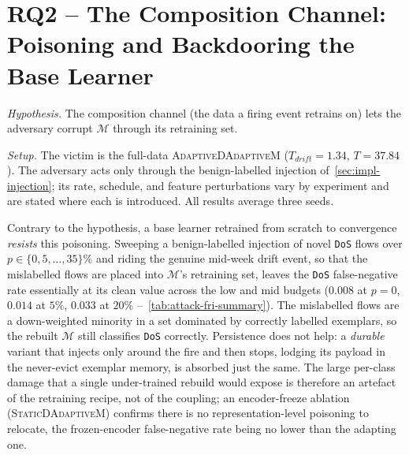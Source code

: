 \section{RQ2 -- The Composition Channel: Poisoning and Backdooring the Base Learner}
\label{sec:eval-rq2}
\textit{Hypothesis.} The composition channel (the data a firing event retrains on) lets the adversary corrupt $\mathcal{M}$ through its retraining set.

\textit{Setup.} The victim is the full-data \textsc{AdaptiveDAdaptiveM} ($T_{drift} = 1.34$, $T = 37.84$). The adversary acts only through the benign-labelled injection of~\cref{sec:impl-injection}; its rate, schedule, and feature perturbations vary by experiment and are stated where each is introduced. All results average three seeds.

Contrary to the hypothesis, a base learner retrained from scratch to convergence \emph{resists} this poisoning. Sweeping a benign-labelled injection of novel \texttt{DoS} flows over $p \in \{0, 5, \dots, 35\}\%$ and riding the genuine mid-week drift event, so that the mislabelled flows are placed into $\mathcal{M}$'s retraining set, leaves the \texttt{DoS} false-negative rate essentially at its clean value across the low and mid budgets ($0.008$ at $p = 0$, $0.014$ at $5\%$, $0.033$ at $20\%$ --~\cref{tab:attack-fri-summary}). The mislabelled flows are a down-weighted minority in a set dominated by correctly labelled exemplars, so the rebuilt $\mathcal{M}$ still classifies \texttt{DoS} correctly. Persistence does not help: a \emph{durable} variant that injects only around the fire and then stops, lodging its payload in the never-evict exemplar memory, is absorbed just the same. The large per-class damage that a single under-trained rebuild would expose is therefore an artefact of the retraining recipe, not of the coupling; an encoder-freeze ablation (\textsc{StaticDAdaptiveM}) confirms there is no representation-level poisoning to relocate, the frozen-encoder false-negative rate being no lower than the adapting one.



